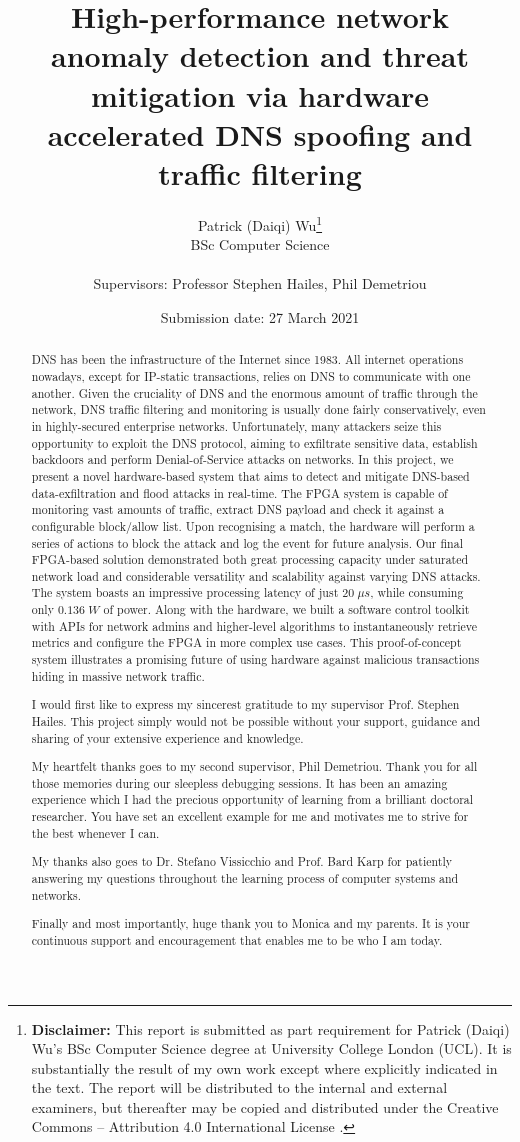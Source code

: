\documentclass[a4paper]{report}
\title{{\vspace{-14em}}
{{\Huge High-performance network anomaly detection and threat mitigation via hardware accelerated DNS spoofing and traffic filtering}} \\
{\large}}
\date{Submission date: 27 March 2021}
\author{Patrick (Daiqi) Wu\thanks{
{\bf Disclaimer:}
This report is submitted as part requirement for Patrick (Daiqi) Wu's BSc Computer Science degree at University College London (UCL). It is
substantially the result of my own work except where explicitly indicated in the text.
The report will be distributed to the internal and external examiners, but thereafter may be copied and distributed under the Creative Commons -- Attribution 4.0 International License \cite{cc-by-4.0}.}
\\
BSc Computer Science\\ \\
Supervisors: Professor Stephen Hailes, Phil Demetriou}
\begin{document}
 
\onehalfspacing
\maketitle
\begin{abstract}
DNS has been the infrastructure of the Internet since 1983. All internet operations nowadays, except for IP-static transactions, relies on DNS to communicate with one another. Given the cruciality of DNS and the enormous amount of traffic through the network, DNS traffic filtering and monitoring is usually done fairly conservatively, even in highly-secured enterprise networks. Unfortunately, many attackers seize this opportunity to exploit the DNS protocol, aiming to exfiltrate sensitive data, establish backdoors and perform Denial-of-Service attacks on networks. In this project, we present a novel hardware-based system that aims to detect and mitigate DNS-based data-exfiltration and flood attacks in real-time. The FPGA system is capable of monitoring vast amounts of traffic, extract DNS payload and check it against a configurable block/allow list. Upon recognising a match, the hardware will perform a series of actions to block the attack and log the event for future analysis. Our final FPGA-based solution demonstrated both great processing capacity under saturated network load and considerable versatility and scalability against varying DNS attacks. The system boasts an impressive processing latency of just $20\; \mu s$, while consuming only $0.136 \; W$ of power. Along with the hardware, we built a software control toolkit with APIs for network admins and higher-level algorithms to instantaneously retrieve metrics and configure the FPGA in more complex use cases. This proof-of-concept system illustrates a promising future of using hardware against malicious transactions hiding in massive network traffic.
\end{abstract}

\renewcommand{\abstractname}{Acknowledgements}
\begin{abstract}
I would first like to express my sincerest gratitude to my supervisor Prof. Stephen Hailes. This project simply would not be possible without your support, guidance and sharing of your extensive experience and knowledge.

My heartfelt thanks goes to my second supervisor, Phil Demetriou. Thank you for all those memories during our sleepless debugging sessions. It has been an amazing experience which I had the precious opportunity of learning from a brilliant doctoral researcher. You have set an excellent example for me and motivates me to strive for the best whenever I can.

My thanks also goes to Dr. Stefano Vissicchio and Prof. Bard Karp for patiently answering my questions throughout the learning process of computer systems and networks.

Finally and most importantly, huge thank you to Monica and my parents. It is your continuous support and encouragement that enables me to be who I am today.
\end{abstract}
\end{document}
